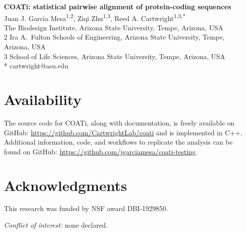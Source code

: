 \documentclass[12pt,letterpaper]{article}
\begin{document}


\begin{flushleft}
{\Large\textbf{COATi: statistical pairwise alignment of protein-coding sequences}}
\newline
\\
Juan J. Garcia Mesa\textsuperscript{1,2},
Ziqi Zhu\textsuperscript{1,3},
Reed A. Cartwright\textsuperscript{1,3,*}
\\
 The Biodesign Institute, Arizona State University, Tempe, Arizona, USA
\\
2 Ira A.\ Fulton Schools of Engineering, Arizona State University, Tempe, Arizona, USA
\\
3 School of Life Sciences, Arizona State University, Tempe, Arizona, USA
\\
\bigskip
* cartwright@asu.edu

\end{flushleft}



\linenumbers







\section*{Availability}
The source code for COATi, along with documentation, is freely available on GitHub: \url{https://github.com/CartwrightLab/coati} and is implemented in C++. Additional information, code, and workflows to replicate the analysis can be found on GitHub: \url{https://github.com/jgarciamesa/coati-testing}.


\section*{Acknowledgments}

This research was funded by NSF award DBI-1929850.


\noindent \textit{Conflict of interest:} none declared.

%
\setlength{\bibhang}{0pt}


\nolinenumbers
\end{document}
